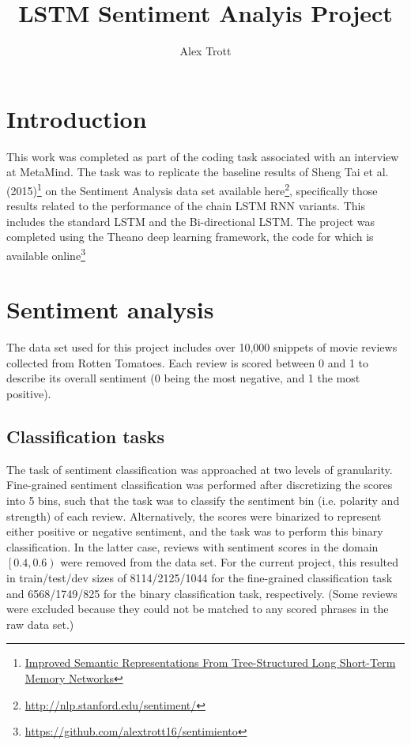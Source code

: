 \documentclass[a4paper]{article}
\title{LSTM Sentiment Analyis Project}
\author{Alex Trott}
\begin{document}
\maketitle

\section{Introduction}

This work was completed as part of the coding task associated with an interview at MetaMind. The task was to replicate the baseline results of Sheng Tai et al. (2015)\footnote{\href{https://arxiv.org/pdf/1503.00075v3}{Improved Semantic Representations From Tree-Structured Long Short-Term Memory Networks}} on the Sentiment Analysis data set available here\footnote{\href{http://nlp.stanford.edu/sentiment}{http://nlp.stanford.edu/sentiment/}}, specifically those results related to the performance of the chain LSTM RNN variants. This includes the standard LSTM and the Bi-directional LSTM. The project was completed using the Theano deep learning framework, the code for which is available online\footnote{\href{https://github.com/alextrott16/sentimiento}{https://github.com/alextrott16/sentimiento}}

\section{Sentiment analysis}

The data set used for this project includes over 10,000 snippets of movie reviews collected from Rotten Tomatoes. Each review is scored between 0 and 1 to describe its overall sentiment (0 being the most negative, and 1 the most positive).

\subsection{Classification tasks}\label{sec:tasks}

The task of sentiment classification was approached at two levels of granularity. Fine-grained sentiment classification was performed after discretizing the scores into 5 bins, such that the task was to classify the sentiment bin (i.e. polarity and strength) of each review. Alternatively, the scores were binarized to represent either positive or negative sentiment, and the task was to perform this binary classification. In the latter case, reviews with sentiment scores in the domain $\left[ 0.4, 0.6 \right)$ were removed from the data set. For the current project, this resulted in train/test/dev sizes of 8114/2125/1044 for the fine-grained classification task and 6568/1749/825 for the binary classification task, respectively. (Some reviews were excluded because they could not be matched to any scored phrases in the raw data set.)
\end{document}
